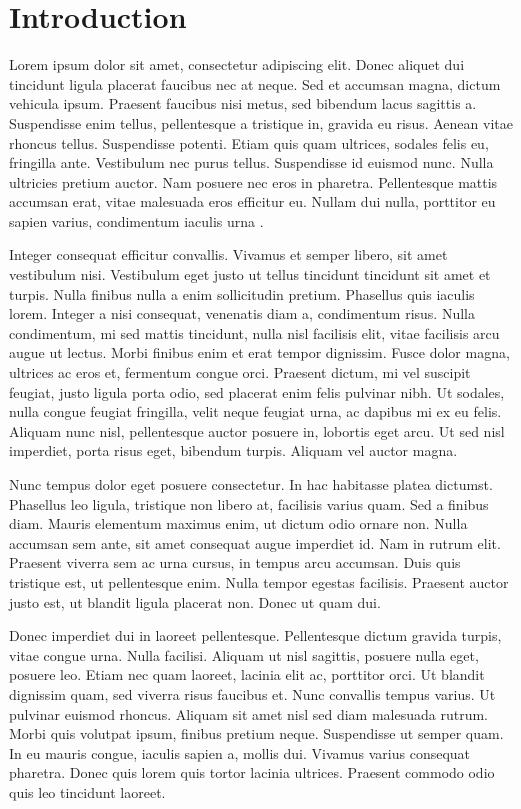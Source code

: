 \chapter{Introduction}

Lorem ipsum dolor sit amet, consectetur adipiscing elit. Donec aliquet dui tincidunt ligula placerat faucibus nec at neque. Sed et accumsan magna, dictum vehicula ipsum. Praesent faucibus nisi metus, sed bibendum lacus sagittis a. Suspendisse enim tellus, pellentesque a tristique in, gravida eu risus. Aenean vitae rhoncus tellus. Suspendisse potenti. Etiam quis quam ultrices, sodales felis eu, fringilla ante. Vestibulum nec purus tellus. Suspendisse id euismod nunc. Nulla ultricies pretium auctor. Nam posuere nec eros in pharetra. Pellentesque mattis accumsan erat, vitae malesuada eros efficitur eu. Nullam dui nulla, porttitor eu sapien varius, condimentum iaculis urna \cite{B76}.

Integer consequat efficitur convallis. Vivamus et semper libero, sit amet vestibulum nisi. Vestibulum eget justo ut tellus tincidunt tincidunt sit amet et turpis. Nulla finibus nulla a enim sollicitudin pretium. Phasellus quis iaculis lorem. Integer a nisi consequat, venenatis diam a, condimentum risus. Nulla condimentum, mi sed mattis tincidunt, nulla nisl facilisis elit, vitae facilisis arcu augue ut lectus. Morbi finibus enim et erat tempor dignissim. Fusce dolor magna, ultrices ac eros et, fermentum congue orci. Praesent dictum, mi vel suscipit feugiat, justo ligula porta odio, sed placerat enim felis pulvinar nibh. Ut sodales, nulla congue feugiat fringilla, velit neque feugiat urna, ac dapibus mi ex eu felis. Aliquam nunc nisl, pellentesque auctor posuere in, lobortis eget arcu. Ut sed nisl imperdiet, porta risus eget, bibendum turpis. Aliquam vel auctor magna.

Nunc tempus dolor eget posuere consectetur. In hac habitasse platea dictumst. Phasellus leo ligula, tristique non libero at, facilisis varius quam. Sed a finibus diam. Mauris elementum maximus enim, ut dictum odio ornare non. Nulla accumsan sem ante, sit amet consequat augue imperdiet id. Nam in rutrum elit. Praesent viverra sem ac urna cursus, in tempus arcu accumsan. Duis quis tristique est, ut pellentesque enim. Nulla tempor egestas facilisis. Praesent auctor justo est, ut blandit ligula placerat non. Donec ut quam dui.

Donec imperdiet dui in laoreet pellentesque. Pellentesque dictum gravida turpis, vitae congue urna. Nulla facilisi. Aliquam ut nisl sagittis, posuere nulla eget, posuere leo. Etiam nec quam laoreet, lacinia elit ac, porttitor orci. Ut blandit dignissim quam, sed viverra risus faucibus et. Nunc convallis tempus varius. Ut pulvinar euismod rhoncus. Aliquam sit amet nisl sed diam malesuada rutrum. Morbi quis volutpat ipsum, finibus pretium neque. Suspendisse ut semper quam. In eu mauris congue, iaculis sapien a, mollis dui. Vivamus varius consequat pharetra. Donec quis lorem quis tortor lacinia ultrices. Praesent commodo odio quis leo tincidunt laoreet.

